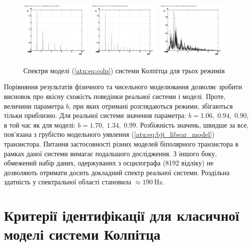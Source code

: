 \begin{figure}[htb!]
 \centerline{
   \includegraphics[width=0.32\textwidth]{p/mod/colp_f-p_f_b=1x70.png}
   \includegraphics[width=0.32\textwidth]{p/mod/colp_f-p_f_b=1x37.png}
   \includegraphics[width=0.32\textwidth]{p/mod/colp_f-p_f_b=0x99.png}
 }
\caption{Спектри моделі (\ref{atu:eq:colp}) системи Колпітца для трьох режимів}
\label{atu:f:colp_model_f}
\end{figure}


Порівняння результатів фізичного та чисельного моделювання
дозволяє зробити висновок про якісну схожість поведінки реальної
системи і моделі. Проте, величини параметра
$ b $, при яких отримані розглядаються режими, збігаються тільки
приблизно. Для реальної системи значення параметра:
$ b = 1.06, \; 0.94, \; 0.90 $, в той час як для моделі:
$ b = 1.70, \; 1.34, \; 0.99 $. Розбіжність
значень, швидше за все, пов'язана з грубістю модельного уявлення
(\ref{atu:eq:bjt_libear_model}) транзистора. Питання застосовності різних
моделей біполярного транзистора в рамках даної системи вимагає
подальшого дослідження. З іншого боку, обмежений набір даних,
одержуваних з осцилографа (8192 відліку) не дозволяють отримати
досить докладний спектр реальної системи. Роздільна здатність у спектральної
області становила $\approx \SI{190}{\hertz} $.


\section{Критерії ідентифікації для класичної моделі системи Колпітца}%

